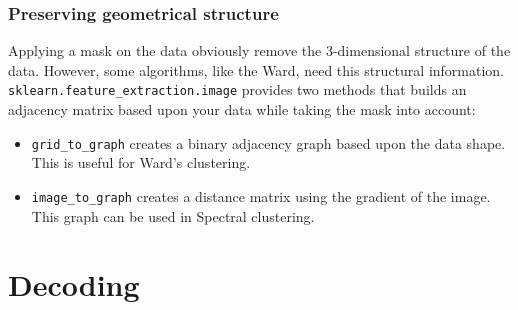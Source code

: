\documentclass{frontiersSCNS} %
\begin{document}

\subsubsection{Preserving geometrical structure}

Applying a mask on the data obviously remove the 3-dimensional structure of the
data. However, some algorithms, like the Ward, need this structural information.
\verb!sklearn.feature_extraction.image! provides two methods that builds an
adjacency matrix based upon your data while taking the mask into account:
\begin{itemize}
    \item \verb!grid_to_graph! creates a binary adjacency graph based upon the
        data shape. This is useful for Ward's clustering.
    \item \verb!image_to_graph! creates a distance matrix using the gradient of
        the image. This graph can be used in Spectral clustering.
\end{itemize}





\section{Decoding}
\end{document}
